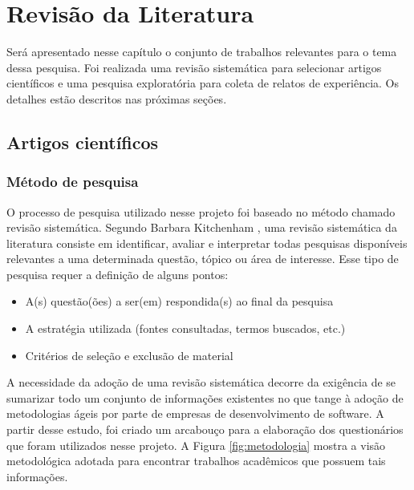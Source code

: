 \chapter{Revisão da Literatura}

Será apresentado nesse capítulo o conjunto de trabalhos relevantes para o tema dessa pesquisa. Foi realizada uma revisão sistemática para selecionar artigos científicos e uma pesquisa exploratória para coleta de relatos de experiência. Os detalhes estão descritos nas próximas seções.

\section{Artigos científicos}

\subsection{Método de pesquisa}

O processo de pesquisa utilizado nesse projeto foi baseado no método chamado revisão sistemática. Segundo Barbara Kitchenham \cite{Barbara04}, uma revisão sistemática da literatura consiste em identificar, avaliar e interpretar todas pesquisas disponíveis relevantes a uma determinada questão, tópico ou área de interesse. Esse tipo de pesquisa requer a definição de alguns pontos:

\begin{itemize}
	\item A(s) questão(ões) a ser(em) respondida(s) ao final da pesquisa
	\item A estratégia utilizada (fontes consultadas, termos buscados, etc.)
	\item Critérios de seleção e exclusão de material
\end{itemize}

A necessidade da adoção de uma revisão sistemática decorre da exigência de se sumarizar todo um conjunto de informações existentes no que tange à adoção de metodologias ágeis por parte de empresas de desenvolvimento de software. A partir desse estudo, foi criado um arcabouço para a elaboração dos questionários que foram utilizados nesse projeto. A Figura \ref{fig:metodologia} mostra a visão metodológica adotada para encontrar trabalhos acadêmicos que possuem tais informações.

